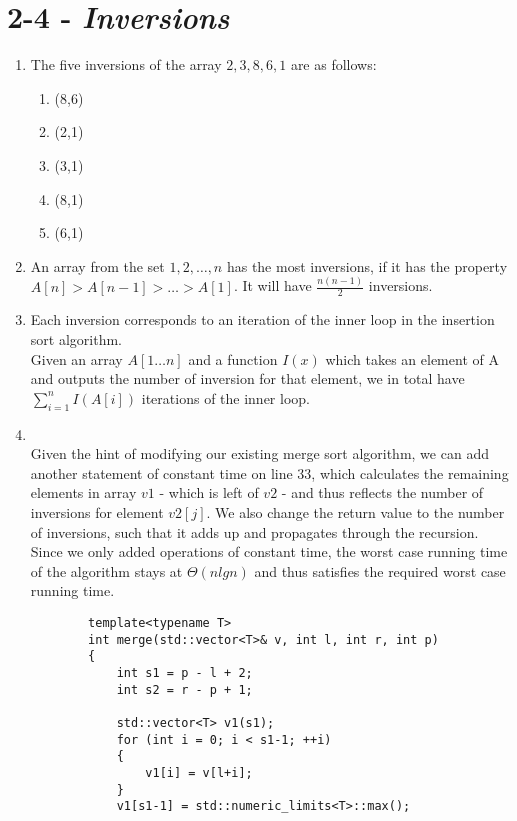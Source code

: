 \documentclass[11pt, letterpaper]{article}
\begin{document}
\section*{2-4 - \textit{Inversions}}
\begin{enumerate}[label=\alph*)]
    \item
    The five inversions of the array ${2,3,8,6,1}$ are as follows:
        \begin{enumerate}
            \item (8,6)
            \item (2,1)
            \item (3,1)
            \item (8,1)
            \item (6,1)
        \end{enumerate}
    \item
        An array from the set ${1,2,\dots,n}$ has the most inversions, if it has the 
        property $A[n]>A[n-1]>\dots>A[1]$. It will have $\frac{n(n-1)}{2}$ inversions.
    \item
        Each inversion corresponds to an iteration of the inner loop in the insertion sort
        algorithm.\\
        Given an array $A[1\dots n]$ and a function $I(x)$ which takes an element of A
        and outputs the number of inversion for that element, we in total have 
        $\sum_{i=1}^{n} I(A[i])$ iterations of the inner loop.
     \item
         ~\\
        Given the hint of modifying our existing merge sort algorithm, we can 
        add another statement of constant time on line 33, which calculates the remaining
        elements in array $v1$ - which is left of $v2$ - and thus reflects the number
        of inversions for element $v2[j]$. We also change the return value to the number 
        of inversions, such that it adds up and propagates through the recursion. Since we 
        only added operations of constant time, the worst case running time of the algorithm stays at
        $\Theta (nlgn)$ and thus satisfies the required worst case running time.
        \begin{lstlisting}
        template<typename T>
        int merge(std::vector<T>& v, int l, int r, int p)
        {
            int s1 = p - l + 2;
            int s2 = r - p + 1;

            std::vector<T> v1(s1);
            for (int i = 0; i < s1-1; ++i)
            {
                v1[i] = v[l+i];
            }
            v1[s1-1] = std::numeric_limits<T>::max();


\end{lstlisting}
\end{enumerate}
\end{document}
